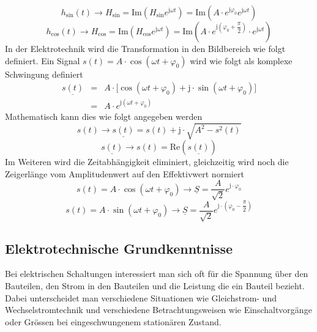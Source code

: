 \begin{equation}
\boxed{h_{\text{sin}}\left(t\right)\longrightarrow H_{\text{sin}}=\text{Im}\left(H_{\text{sin}}e^{\text{j}\omega t}\right)=\text{Im}\left(A\cdot e^{\text{j}\varphi_0}e^{\text{j}\omega t}\right)}
\end{equation}
\begin{equation}
\boxed{h_{\text{cos}}\left(t\right)\longrightarrow H_{\text{cos}}=\text{Im}\left(H_{\text{cos}}e^{\text{j}\omega t}\right)=\text{Im}\left(A\cdot e^{\text{j}\left(\varphi_0+\dfrac{\pi}{2}\right)}\cdot e^{\text{j}\omega t}\right)}
\end{equation}
In der Elektrotechnik wird die Transformation in den Bildbereich wie folgt definiert. Ein Signal $s\left(t\right)=A\cdot \cos\left(\omega t+\varphi_0\right)$ wird wie folgt als komplexe Schwingung definiert
\begin{equation}
\boxed{
\begin{array}{lll}
\underline{s\left(t\right)}&=&A\cdot \Big[\cos\left(\omega t+\varphi_0\right)+\text{j}\cdot \sin\left(\omega t+\varphi_0\right)\Big]\\
&=&A\cdot e^{\text{j}\left(\omega t +\varphi_0\right)}
\end{array}
}
\end{equation}
Mathematisch kann dies wie folgt angegeben werden
\begin{equation}
\boxed{s\left(t\right)\longrightarrow \underline{s\left(t\right)}=s\left(t\right)+\text{j}\cdot \sqrt{A^2-s^2\left(t\right)}}
\end{equation}
\begin{equation}
\boxed{\underline{s\left(t\right)}\longrightarrow s\left(t\right)=\text{Re}\left(\underline{s\left(t\right)}\right)}
\end{equation}
Im Weiteren wird die Zeitabhängigkeit eliminiert, gleichzeitig wird noch die Zeigerlänge vom Amplitudenwert auf den Effektivwert normiert
\begin{equation}
\boxed{s\left(t\right)=A\cdot \cos\left(\omega t+\varphi_0\right)\rightarrow \underline{S}=\dfrac{A}{\sqrt{2}}e^{\text{j}\cdot \varphi_0}}
\end{equation}
\begin{equation}
\boxed{s\left(t\right)=A\cdot \sin\left(\omega t+\varphi_0\right)\rightarrow \underline{S}=\dfrac{A}{\sqrt{2}}e^{\text{j}\cdot \left(\varphi_0-\dfrac{\pi}{2}\right)}}
\end{equation}
\subsection{Elektrotechnische Grundkenntnisse}
Bei elektrischen Schaltungen interessiert man sich oft für die Spannung über den Bauteilen, den Strom in den Bauteilen und die Leistung die ein Bauteil bezieht. Dabei unterscheidet man verschiedene Situationen wie Gleichstrom- und Wechselstromtechnik und verschiedene Betrachtungsweisen wie Einschaltvorgänge oder Grössen bei eingeschwungenem stationären Zustand.
